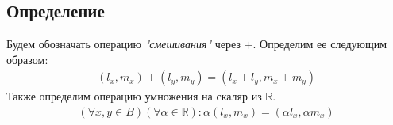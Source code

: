 \subsection*{Определение}
Будем обозначать операцию \textit{"смешивания"} через $+$. Определим ее следующим образом:
\begin{align}
  (l_x, m_x) + (l_y,m_y) = (l_x + l_y, m_x + m_y)
  \label{plus_def}
\end{align}
Также определим операцию умножения на скаляр из $\mathbb{R}$.
\begin{align}
  (\forall x,y \in B)(\forall \alpha \in \mathbb{R}):
  \alpha(l_x, m_x) = (\alpha l_x, \alpha m_x)
  \label{multiply_def}
\end{align}
